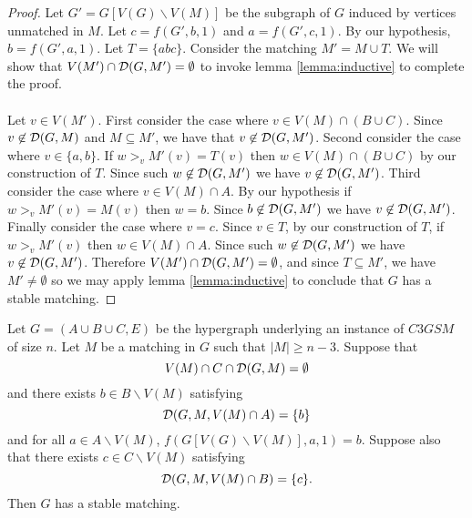 \begin{proof}
Let $G' = G[V(G)\backslash V(M)]$ be the subgraph of $G$ induced by vertices unmatched in $M$. Let $c = f(G',b,1)$ and $a = f(G',c,1)$. By our hypothesis, $b = f(G',a,1)$. Let $T = \{abc\}$. Consider the matching $M' = M \cup T$. We will show that $V(M') \cap \mathcal{D}(G, M') = \emptyset$ to invoke lemma \ref{lemma:inductive} to complete the proof.
\paragraph{}
Let $v \in V(M')$. First consider the case where $v \in V(M) \cap ( B \cup C)$. Since $v \not\in \mathcal{D}(G,M)$ and $M \subseteq M'$, we have that $v \not\in \mathcal{D}(G,M')$. Second consider the case where $v \in \{a,b\}$. If $w >_v M'(v)=T(v)$ then $w \in V(M) \cap (B \cup C)$ by our construction of $T$. Since such $ w\not\in \mathcal{D}(G,M')$ we have $v \not\in \mathcal{D}(G,M')$. Third consider the case where $v \in V(M) \cap A$. By our hypothesis if $w >_v M'(v) = M(v)$ then $w = b$. Since $b \not\in \mathcal{D}(G,M')$ we have $v \not\in \mathcal{D}(G,M')$. Finally consider the case where $v = c$. Since $v \in T$, by our construction of $T$, if $w >_v M'(v)$ then $w \in V(M) \cap A$. Since such $w \not\in \mathcal{D}(G,M')$ we have $v \not\in \mathcal{D}(G,M')$. Therefore $V(M') \cap \mathcal{D}(G,M') = \emptyset$, and since $T \subseteq M'$,  we have $M' \neq \emptyset$ so we may apply lemma \ref{lemma:inductive} to conclude that $G$ has a stable matching.
\end{proof}
\begin{lemma}\label{lemma:partial-match-2}
Let $G=(A\cup B \cup C, E)$ be the hypergraph underlying an instance of $C3GSM$ of size $n$. Let $M$ be a matching in $G$ such that $|M| \geq n-3$. Suppose that 
$$V(M) \cap C \cap \mathcal{D}(G,M) = \emptyset$$
and there exists $b \in B \backslash V(M)$ satisfying
$$\mathcal{D}(G,M,V(M) \cap A) = \{b\}$$
and for all $a \in A \backslash V(M)$, $f(G[V(G)\backslash V(M)], a, 1) = b$. Suppose also that there exists $c \in C \backslash V(M)$ satisfying
$$\mathcal{D}(G,M,V(M) \cap B ) = \{c\}.$$ 
Then $G$ has a stable matching.
\end{lemma}
